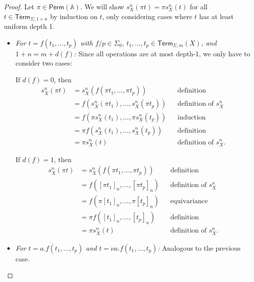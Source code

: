 \documentclass[a4paper,UKenglish,cleveref,thm-restate,numberwithinsect,final]{lipics-v2021}
\newcommand{\Perm}{\mathsf{Perm}(\Names)}
\newcommand{\Term}{\mathsf{Term}}
\newcommand{\sig}{\Sigma}
\newcommand{\sigp}{\Sigma_0}
\newcommand{\Names}{\mathbb{A}}
\theoremstyle{plain}
\numberwithin{equation}{section}
\newcommand{\+}[1]{\mathcal{#1}\xspace}
\theoremstyle{definition}
\begin{document}
\begin{proof}
    Let \(\pi \in \Perm\). We will show \(s^n_X(\pi t) = \pi s^n_X(t)\) for all \(t \in \Term_{\sig, 1 + n}\) by induction on \(t\), only considering cases where \(t\) has at least uniform depth 1.
    \begin{itemize}
        \item
            \textit{For \(t = f(t_1, \ldots, t_p)\) with \(f/p \in \sigp\), \(t_1, \ldots, t_p \in \Term_{\sig, m}(X)\), and \(1 + n = m + d(f)\):}
            Since all operations are at most depth-1, we only have to consider two cases:

            If \(d(f) = 0\), then
            \begin{align*}
                s^n_X(\pi t)
                &= s^n_X(f(\pi t_1, \ldots, \pi t_p)) && \text{definition} \\
                &= f(s^n_X(\pi t_1), \ldots, s^n_X(\pi t_p)) && \text{definition of } s^n_X \\
                &= f(\pi s^n_X(t_1), \ldots, \pi s^n_X(t_p)) && \text{induction} \\
                &= \pi f(s^n_X(t_1), \ldots, s^n_X(t_p)) && \text{definition} \\
                &= \pi s^n_X(t) && \text{definition of } s^n_X.
            \end{align*}

            If \(d(f) = 1\), then
            \begin{align*}
                s^n_X(\pi t)
                &= s^n_X(f(\pi t_1, \ldots, \pi t_p)) && \text{definition} \\
                &= f([\pi t_1]_n, \ldots, [\pi t_p]_n) && \text{definition of } s^n_X \\
                &= f(\pi[t_1]_n, \ldots, \pi[t_p]_n) && \text{equivariance} \\
                &= \pi f([t_1]_n, \ldots, [t_p]_n) && \text{definition} \\
                &= \pi s^n_X(t) && \text{definition of } s^n_X.
            \end{align*}
        \item
            \textit{For \(t = a.f(t_1, \ldots, t_p)\) and \(t = \nu a.f(t_1, \ldots, t_p)\):}
            Analogous to the previous case.
    \end{itemize}

\end{proof}
\end{document}
